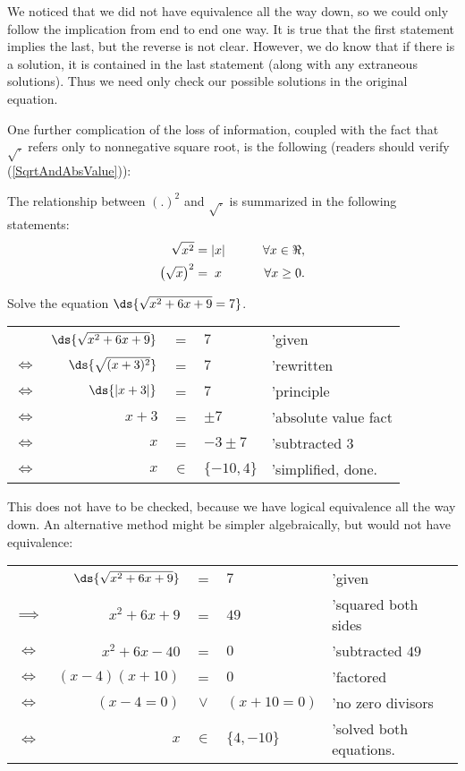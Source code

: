 \eex 


\noindent We noticed that we did not have equivalence all the way down,
so we could only follow the implication from end to end one way.  It is
true that the first statement implies the last, but the reverse is
not clear.  However, we do know
that if there is a solution, it is contained in the last statement
(along with any extraneous solutions).
Thus we need only check our possible solutions in the original equation.

One further complication of the loss of information, coupled
with the fact that $\sqrt{.}$ refers only to nonnegative
square root, is the following (readers should verify 
(\ref{SqrtAndAbsValue})):
\begin{principle} The relationship between $(.)^2$ and $\sqrt{.}$
is summarized in the following statements:
\begin{eqnarray}
\sqrt{x^2}&=|x|&\qquad\forall x\in\Re,\label{SqrtAndAbsValue}\\
\left(\sqrt{x}\right)^2&=\hphantom{|}x\hphantom{|}
&\qquad\forall x\ge0.\end{eqnarray}
\end{principle}

\bex Solve the equation $\ds{\sqrt{x^2+6x+9}=7}$.

\noindent\begin{tabular}{crcll}
&$\ds{\sqrt{x^2+6x+9}}$&=&$7$&'given\\
$\iff$&$\ds{\sqrt{(x+3)^2}}$&=&$7$ &'rewritten\\
$\iff$&$\ds{|x+3|}$&=&$7$&'principle\\
$\iff$&$x+3$&=&$\pm 7$&'absolute value fact\\
$\iff$&$x$&=&$-3\pm7$&'subtracted $3$\\ 
$\iff$&$x$&$\in$&$\{-10,4\}$&'simplified, done.\end{tabular}

This does not have to be checked, because we have logical
equivalence all the way down.  An alternative method might 
be simpler algebraically, but would not have equivalence:

\noindent\begin{tabular}{crcll}
&$\ds{\sqrt{x^2+6x+9}}$&=&$7$&'given\\
$\implies$&$x^2+6x+9$&=&$49$&'squared both sides\\
$\iff$&$x^2+6x-40$&=&$0$&'subtracted $49$ \\
$\iff$&$(x-4)(x+10)$&=&$0$&'factored\\
$\iff$&$(x-4=0)$&$\vee$&$(x+10=0)$&'no  zero divisors\\
$\iff$&$x$&$\in$&$\{4,-10\}$&'solved both equations.
\end{tabular}

